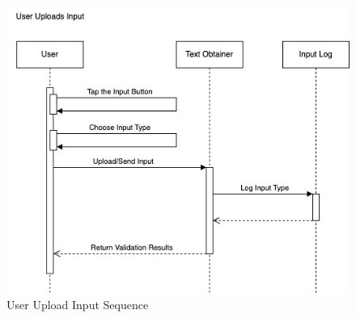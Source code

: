 \begin{figure}[H]
	\centering
	\includegraphics[width=\textwidth, height=\textheight, keepaspectratio]{Section3/images/UserUploadsInputSequenceDiagram.drawio.png}
	\caption{User Upload Input Sequence}
	\label{UserUploadsInputSequence}
\end{figure}